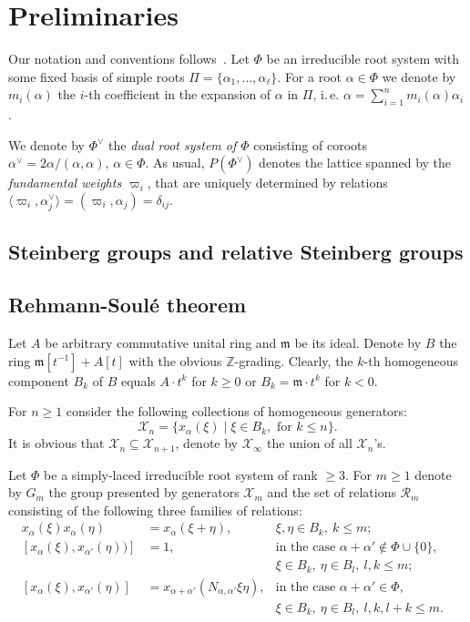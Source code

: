 \documentclass[oneside, 10pt]{amsart}
\newcommand{\XX}[1]{\mathcal{X}_{#1}}
\newcommand{\RR}[1]{\mathcal{R}_{#1}}
\numberwithin{equation}{section}
\numberwithin{lemma}{section}
\theoremstyle{definition}
\theoremstyle{remark}
\begin{document}
\section{Preliminaries}

Our notation and conventions follows~\cite[\S~4]{Vav09}.
Let $\Phi$ be an irreducible root system with some fixed basis of simple roots $\Pi = \{\alpha_1, \ldots, \alpha_\ell\}$.
For a root $\alpha\in\Phi$ we denote by $m_i(\alpha)$ the $i$-th coefficient in the expansion of $\alpha$ in $\Pi$,
 i.\,e. $\alpha = \sum_{i=1}^n m_i(\alpha) \alpha_i$.

We denote by $\Phi^\vee$ the \emph{dual root system of $\Phi$} consisting of coroots $\alpha^\vee = 2\alpha/(\alpha, \alpha)$, $\alpha\in \Phi$.
As usual, $P(\Phi^\vee)$ denotes the lattice spanned by the \emph{fundamental weights $\varpi_i$},
 that are uniquely determined by relations $\langle\varpi_i, \alpha_j^\vee \rangle = (\varpi_i, \alpha_j) = \delta_{ij}.$ %

\subsection{Steinberg groups and relative Steinberg groups}

\subsection{Rehmann-Soul{\'e} theorem}

Let $A$ be arbitrary commutative unital ring and $\mathfrak{m}$ be its ideal.
Denote by $B$ the ring $\mathfrak{m}[t^{-1}] + A[t]$ with the obvious $\mathbb{Z}$-grading.
Clearly, the $k$-th homogeneous component $B_k$ of $B$ equals $A\cdot t^k$ for $k \geq 0$ or $B_k = \mathfrak{m} \cdot t^k$ for $k<0$.

For $n \geq 1$ consider the following collections of homogeneous generators:
\[\XX{n} = \{ x_\alpha(\xi) \mid \xi \in B_k,\text{ for } k\leq n\}. \]
It is obvious that $\XX{n} \subseteq \XX{n+1}$, denote by $\XX{\infty}$ the union of all $\XX{n}$'s.

Let $\Phi$ be a simply-laced irreducible root system of rank $\geq 3$.
For $m\geq 1$ denote by $G_m$ the group presented by generators $\mathcal{X}_m$ and the set of relations $\RR{m}$ consisting of the following
 three families of relations:
\begin{align}
 \label{eq:am} \tag{$a_m$} x_\alpha(\xi) x_\alpha(\eta) & = x_\alpha(\xi+\eta),&  \xi,\eta\in B_k,\ k\leq m;&\\
 \label{eq:bm} \tag{$b_m$} [x_\alpha(\xi), x_{\alpha'}(\eta))] &  = 1, & \text{in the case $\alpha+\alpha'\not\in\Phi\cup\{0\}$,}\\
 \nonumber                                                     &       & \xi \in B_k,\ \eta \in B_l,\ l,k\leq m;\\
 \label{eq:cm} \tag{$c_m$} [x_\alpha(\xi), x_{\alpha'}(\eta)] & = x_{\alpha+\alpha'}(N_{\alpha,\alpha'}\xi\eta), & \text{in the case $\alpha+\alpha'\in \Phi$,}\\
 \nonumber                                                    &  & \xi \in B_k,\ \eta \in B_l,\ l, k, l+k \leq m.
 \end{align}
\end{document}
